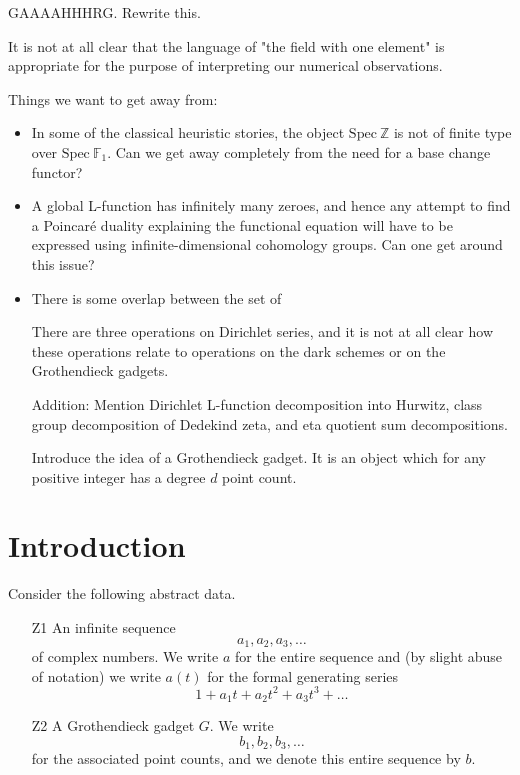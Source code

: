 \documentclass[paper=a4, fontsize=11pt]{scrartcl} %
\numberwithin{equation}{section} %
\numberwithin{figure}{section} %
\numberwithin{table}{section} %
\begin{document}
GAAAAHHHRG. Rewrite this.

It is not at all clear that the language of "the field with one element" is appropriate for the purpose of interpreting our numerical observations.

Things we want to get away from:
\begin{itemize}
\item In some of the classical heuristic stories, the object $\mathrm{Spec} \ \mathbb{Z}$ is not of finite type over $\mathrm{Spec} \ \mathbb{F}_1$. Can we get away completely from the need for a base change functor?
\item A global L-function has infinitely many zeroes, and hence any attempt to find a Poincaré duality explaining the functional equation will have to be expressed using infinite-dimensional cohomology groups. Can one get around this issue?

\item There is some overlap between the set of


There are three operations on Dirichlet series, and it is not at all clear how these operations relate to operations on the dark schemes or on the Grothendieck gadgets.

Addition: Mention Dirichlet L-function decomposition into Hurwitz, class group decomposition of Dedekind zeta, and eta quotient sum decompositions.



Introduce the idea of a Grothendieck gadget. It is an object which for any positive integer has a degree $d$ point count.

\end{itemize}


\section{Introduction}

Consider the following abstract data.

\begin{itemize}
\item[Z1] An infinite sequence
$$ a_1, a_2, a_3, \ldots  $$
of complex numbers. We write $a$ for the entire sequence and (by slight abuse of notation) we write $a(t)$ for the formal generating series
$$ 1 + a_1 t + a_2 t^2 + a_3 t^3 + \ldots $$
\item[Z2] A Grothendieck gadget $G$. We write
$$ b_1, b_2, b_3, \ldots   $$
for the associated point counts, and we denote this entire sequence by $b$.
\end{itemize}
\end{document}

